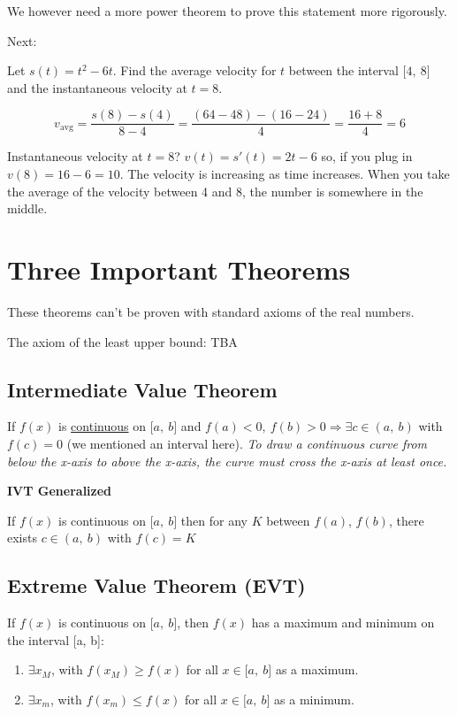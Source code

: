 \documentclass[
]{article}
\begin{document}
We however need a more power theorem to prove this statement more
rigorously.

Next:

Let $s(t) = t^{2} - 6t$. Find the average velocity for $t$ between
the interval $\lbrack 4,\ 8\rbrack$ and the instantaneous velocity at
$t = 8$.

$$v_{\text{avg}} = \frac{s(8) - s(4)}{8 - 4} = \frac{(64 - 48) - (16 - 24)}{4} = \frac{16 + 8}{4} = 6$$

Instantaneous velocity at $t = 8$? $v(t) = s'(t) = 2t - 6$ so, if
you plug in $v(8) = 16 - 6 = 10$. The velocity is increasing as time
increases. When you take the average of the velocity between 4 and 8,
the number is somewhere in the middle.


\section{Three Important Theorems}

These theorems can't be proven with standard axioms of the real numbers.

The axiom of the least upper bound: TBA


\subsection{Intermediate Value
Theorem}

If $f(x)$ is \uline{continuous} on $\lbrack a,\ b\rbrack$ and
$f(a) < 0,\ f(b) > 0 \Rightarrow \exists c \in (a,\ b)$ with
$f(c) = 0$ (we mentioned an interval here). \emph{To draw a continuous
curve from below the x-axis to above the x-axis, the curve must cross
the x-axis at least once.}

\textbf{IVT Generalized}

If $f(x)$ is continuous on $\lbrack a,\ b\rbrack$ then for any $K$
between $f(a)$, $f(b)$, there exists $c \in (a,\ b)$ with
$f(c) = K$


\subsection{Extreme Value Theorem
(EVT)}

If $f(x)$ is continuous on $\lbrack a,\ b\rbrack$, then $f(x)$ has
a maximum and minimum on the interval {[}a, b{]}:

\begin{enumerate}
\def\labelenumi{\arabic{enumi}.}
\item
  $\exists x_{M}$, with $f\left( x_{M} \right) \geq f(x)$ for all
  $x \in \lbrack a,\ b\rbrack$ as a maximum.
\item
  $\mathbf{\exists}x_{m}$, with $f\left( x_{m} \right) \leq f(x)$
  for all $x \in \lbrack a,\ b\rbrack$ as a minimum.
\end{enumerate}
\end{document}
